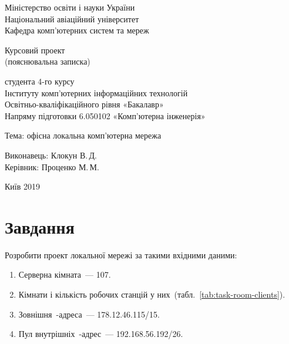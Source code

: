 \documentclass[
  ukrainian,
  simple,
  floatsection,
]{eskdnaukvd}
\begin{document}

  \begin{titlepage}
  \begin{center}
      Міністерство освіти і науки України\\
      Національний авіаційний університет\\
      Кафедра комп'ютерних систем та мереж

      \vspace{\fill}
      Курсовий проект\\
      (пояснювальна записка)\\

      \vspace{1 \baselineskip}

      студента 4-го курсу\\
      Інституту комп'ютерних інформаційних технологій\\
      Освітньо-кваліфікаційного рівня «Бакалавр»\\
      Напряму підготовки 6.050102 «Комп'ютерна інженерія»

      \vspace{1 \baselineskip}

      \begin{flushleft}
      Тема: офісна локальна комп'ютерна мережа

      \vspace{2 \baselineskip}

      Виконавець: \hfill Клокун В.\,Д.\\
      Керівник: \hfill Проценко М.\,М.
      \end{flushleft}

      \vspace{\fill}

      Київ 2019
    \end{center}
  \end{titlepage}

  \newpage
  \setcounter{page}{2}

  \tableofcontents

  \section*{Завдання}
    Розробити проект локальної мережі за такими вхідними даними:
    \begin{enumerate}
      \item Серверна кімната~— 107.
      \item Кімнати і кількість робочих станцій у них~(табл.~\ref{tab:task-room-clients}).
      \item Зовнішня~\textenglish{}-адреса~— 178.12.46.115/15.
      \item Пул внутрішніх~\textenglish{}-адрес~— 192.168.56.192/26.
    \end{enumerate}
\end{document}
